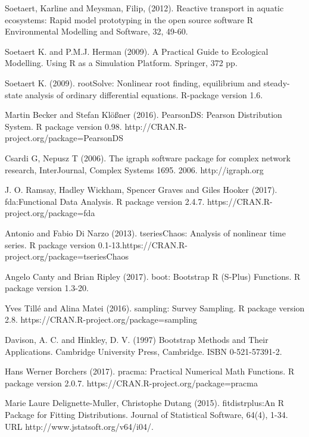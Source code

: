 \documentclass[preprint, 8pt]{elsarticle}
\theoremstyle{definition}
\begin{document}
\begin{thebibliography}{00}
Soetaert, Karline and Meysman, Filip, (2012).
\newblock Reactive transport in aquatic ecosystems: Rapid model prototyping in the open source software R
\newblock Environmental Modelling and Software, 32, 49-60.

Soetaert K. and P.M.J. Herman (2009).  
\newblock A Practical Guide to Ecological Modelling. 
\newblock Using R as a Simulation Platform.  Springer, 372 pp.

Soetaert K. (2009).  
\newblock rootSolve: Nonlinear root finding, equilibrium and steady-state analysis of ordinary differential equations.  
\newblock R-package version 1.6.

Martin Becker and Stefan Klößner (2016). 
\newblock PearsonDS: Pearson Distribution System. 
\newblock R package version 0.98. http://CRAN.R-project.org/package=PearsonDS

Csardi G, Nepusz T (2006).
\newblock The igraph software package for complex network research,
\newblock  InterJournal, Complex Systems 1695. 2006. http://igraph.org

 J. O. Ramsay, Hadley Wickham, Spencer Graves and Giles Hooker (2017). 
\newblock fda:Functional Data Analysis. 
\newblock R package version 2.4.7. https://CRAN.R-project.org/package=fda

 Antonio and Fabio Di Narzo (2013).
\newblock tseriesChaos: Analysis of nonlinear time series. 
\newblock R package version 0.1-13.https://CRAN.R-project.org/package=tseriesChaos

 Angelo Canty and Brian Ripley (2017). 
\newblock boot: Bootstrap R (S-Plus) Functions. 
\newblock R package version 1.3-20.

Yves Tillé and Alina Matei (2016). 
\newblock sampling: Survey Sampling. 
\newblock R package version 2.8. https://CRAN.R-project.org/package=sampling

 Davison, A. C. and Hinkley, D. V. (1997) 
\newblock Bootstrap Methods and Their Applications. 
\newblock Cambridge University Press, Cambridge. ISBN 0-521-57391-2.

Hans Werner Borchers (2017). 
\newblock pracma: Practical Numerical Math Functions. 
\newblock R package version 2.0.7. https://CRAN.R-project.org/package=pracma

Marie Laure Delignette-Muller, Christophe Dutang (2015). 
\newblock fitdistrplus:An R Package for Fitting Distributions. 
\newblock Journal of Statistical Software, 64(4), 1-34. URL http://www.jstatsoft.org/v64/i04/.


\end{thebibliography}
\end{document}
